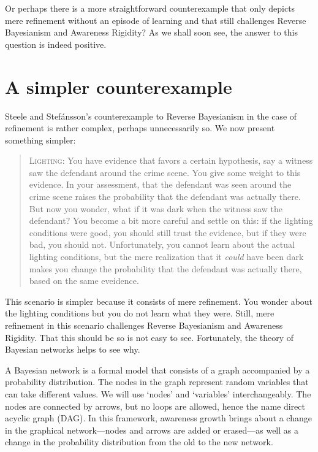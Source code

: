 \documentclass[
  11pt,
  dvipsnames,enabledeprecatedfontcommands]{scrartcl}
\begin{document}
Or perhaps there is a more straightforward counterexample that only
depicts mere refinement without an episode of learning and that still
challenges Reverse Bayesianism and Awareness Rigidity? As we shall soon
see, the answer to this question is indeed positive.

\hypertarget{a-simpler-counterexample}{%
\section{A simpler counterexample}\label{a-simpler-counterexample}}

Steele and Stefánsson's counterexample to Reverse Bayesianism in the
case of refinement is rather complex, perhaps unnecessarily so. We now
present something simpler:

\begin{quote}
\textsc{Lighting:} You have evidence that favors a certain hypothesis,
say a witness saw the defendant around the crime scene. You give some
weight to this evidence. In your assessment, that the defendant was seen
around the crime scene raises the probability that the defendant was
actually there. But now you wonder, what if it was dark when the witness
saw the defendant? You become a bit more careful and settle on this: if
the lighting conditions were good, you should still trust the evidence,
but if they were bad, you should not. Unfortunately, you cannot learn
about the actual lighting conditions, but the mere realization that it
\textit{could} have been dark makes you change the probability that the
defendant was actually there, based on the same eveidence.
\end{quote}

\noindent This scenario is simpler because it consists of mere
refinement. You wonder about the lighting conditions but you do not
learn what they were. Still, mere refinement in this scenario challenges
Reverse Bayesianism and Awareness Rigidity. That this should be so is
not easy to see. Fortunately, the theory of Bayesian networks helps to
see why.

A Bayesian network is a formal model that consists of a graph
accompanied by a probability distribution. The nodes in the graph
represent random variables that can take different values. We will use
`nodes' and `variables' interchangeably. The nodes are connected by
arrows, but no loops are allowed, hence the name direct acyclic graph
(DAG). In this framework, awareness growth brings about a change in the
graphical network---nodes and arrows are added or erased---as well as a
change in the probability distribution from the old to the new network.
\end{document}
